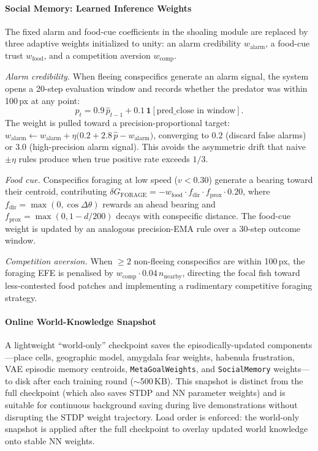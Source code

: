 \documentclass[12pt]{article}
\begin{document}
\paragraph{Social Memory: Learned Inference Weights}

The fixed alarm and food-cue coefficients in the shoaling module
are replaced by three adaptive weights initialized to unity:
an alarm credibility $w_\text{alarm}$, a food-cue trust $w_\text{food}$,
and a competition aversion $w_\text{comp}$.

\textit{Alarm credibility.}
When fleeing conspecifics generate an alarm signal, the system
opens a 20-step evaluation window and records whether the predator
was within 100\,px at any point:
\begin{equation}\label{eq:alarm_precision}
  \hat{p}_t = 0.9\,\hat{p}_{t-1}
    + 0.1\,\mathbf{1}[\text{pred\_close in window}].
\end{equation}
The weight is pulled toward a precision-proportional target:
$w_\text{alarm} \leftarrow w_\text{alarm}
+ \eta\bigl(0.2 + 2.8\,\hat{p} - w_\text{alarm}\bigr)$,
converging to $0.2$ (discard false alarms) or $3.0$ (high-precision
alarm signal).
This avoids the asymmetric drift that naive $\pm\eta$ rules produce
when true positive rate exceeds $1/3$.

\textit{Food cue.}
Conspecifics foraging at low speed ($v < 0.30$) generate a bearing
toward their centroid, contributing
$\delta G_\text{FORAGE} = -w_\text{food} \cdot f_\text{dir} \cdot
f_\text{prox} \cdot 0.20$,
where $f_\text{dir} = \max(0, \cos\Delta\theta)$ rewards an ahead
bearing and $f_\text{prox} = \max(0, 1 - d/200)$ decays with
conspecific distance.
The food-cue weight is updated by an analogous precision-EMA rule
over a 30-step outcome window.

\textit{Competition aversion.}
When $\geq 2$ non-fleeing conspecifics are within 100\,px, the
foraging EFE is penalised by $w_\text{comp} \cdot 0.04\,n_\text{nearby}$,
directing the focal fish toward less-contested food patches and
implementing a rudimentary competitive foraging strategy.

\paragraph{Online World-Knowledge Snapshot}

A lightweight ``world-only'' checkpoint saves the episodically-updated
components---place cells, geographic model, amygdala fear weights,
habenula frustration, VAE episodic memory centroids,
\texttt{MetaGoalWeights}, and \texttt{SocialMemory} weights---to disk
after each training round ($\sim$500\,KB).
This snapshot is distinct from the full checkpoint (which also saves
STDP and NN parameter weights) and is suitable for continuous background
saving during live demonstrations without disrupting the STDP weight
trajectory.
Load order is enforced: the world-only snapshot is applied after the
full checkpoint to overlay updated world knowledge onto stable NN weights.
\end{document}
